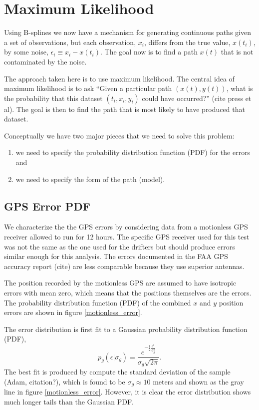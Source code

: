 \documentclass[twocol]{ametsoc}
\begin{document}
%
\section{Maximum Likelihood}
%

Using B-splines we now have a mechanism for generating continuous paths given a set of observations, but each observation, $x_i$, differs from the true value, $x(t_i)$, by some noise, $\epsilon_i \equiv x_i - x(t_i)$. The goal now is to find a path $x(t)$ that is not contaminated by the noise.

The approach taken here is to use maximum likelihood. The central idea of maximum likelihood is to ask ``Given a particular path $(x(t),y(t))$, what is the probability that this dataset $(t_i,x_i, y_i)$ could have occurred?'' (cite press et al). The goal is then to find the path that is most likely to have produced that dataset.

Conceptually we have two major pieces that we need to solve this problem:
\begin{enumerate}
\item we need to specify the probability distribution function (PDF) for the errors and
\item we need to specify the form of the path (model).
\end{enumerate}

%
\subsection{GPS Error PDF}
%

We characterize the the GPS errors by considering data from a motionless GPS receiver allowed to run for 12 hours. The specific GPS receiver used for this test was not the same as the one used for the drifters but should produce errors similar enough for this analysis. The errors documented in the FAA GPS accuracy report (cite) are less comparable because they use superior antennas.

The position recorded by the motionless GPS are assumed to have isotropic errors with mean zero, which means that the positions themselves are the errors. The probability distribution function (PDF) of the combined $x$ and $y$ position errors are shown in figure \ref{motionless_error}.

The error distribution is first fit to a Gaussian probability distribution function (PDF),
\begin{equation}
\label{gaussian_pdf}
p_g(\epsilon|\sigma_g) = \frac{e^{-\frac{1}{2}\frac{\epsilon^2}{\sigma_g^2}} }{\sigma_g \sqrt{ 2 \pi}}.
\end{equation}
The best fit is produced by compute the standard deviation of the sample (Adam, citation?), which is found to be $\sigma_g \approx 10$ meters and shown as the gray line in figure \ref{motionless_error}. However, it is clear the error distribution shows much longer tails than the Gaussian PDF.
\end{document}
